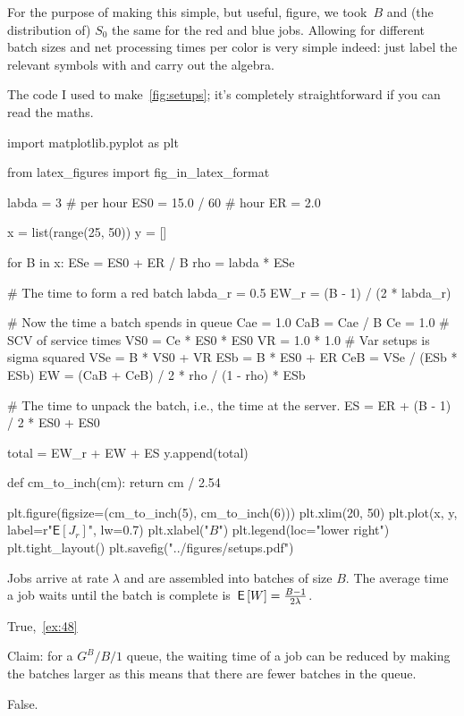 \documentclass[stochastic-or.tex]{subfiles}
\begin{document}
For the purpose of making this simple, but useful, figure, we took~$B$ and (the distribution of) $S_{0}$ the same for the red and blue jobs.
Allowing for different batch sizes and net processing times per color is very simple indeed: just label the relevant symbols with and carry out the algebra.

The code I used to make~\cref{fig:setups}; it's completely straightforward if you can read the maths.
\begin{python}
import matplotlib.pyplot as plt

from latex_figures import fig_in_latex_format


labda = 3  # per hour
ES0 = 15.0 / 60  # hour
ER = 2.0

x = list(range(25, 50))
y = []

for B in x:
    ESe = ES0 + ER / B
    rho = labda * ESe

    # The time to form a red batch
    labda_r = 0.5
    EW_r = (B - 1) / (2 * labda_r)

    # Now the time a batch spends in queue
    Cae = 1.0
    CaB = Cae / B
    Ce = 1.0  # SCV of service times
    VS0 = Ce * ES0 * ES0
    VR = 1.0 * 1.0  # Var setups is sigma squared
    VSe = B * VS0 + VR
    ESb = B * ES0 + ER
    CeB = VSe / (ESb * ESb)
    EW = (CaB + CeB) / 2 * rho / (1 - rho) * ESb

    # The time to unpack the batch, i.e., the time at the server.
    ES = ER + (B - 1) / 2 * ES0 + ES0

    total = EW_r + EW + ES
    y.append(total)


def cm_to_inch(cm):
    return cm / 2.54


plt.figure(figsize=(cm_to_inch(5), cm_to_inch(6)))
plt.xlim(20, 50)
plt.plot(x, y, label=r"$\mathsf{E}[J_r]$", lw=0.7)
plt.xlabel("$B$")
plt.legend(loc="lower right")
plt.tight_layout()
plt.savefig("../figures/setups.pdf")
\end{python}


\begin{truefalse}
 Jobs arrive at rate $\lambda$ and are assembled into batches of size $B$.
 The average time a job waits until the batch is complete is $\,\mathsf{E}\left[W\right] = \frac{B-1}{2\lambda}$.
\begin{solution}True,~\cref{ex:48}
\end{solution}
\end{truefalse}

\begin{truefalse}
    Claim: for a $G^{B}/B/1$ queue, the waiting time of a job can be reduced by making the batches larger as this means that there are fewer batches in the queue.
    \begin{solution}
        False.
    \end{solution}
\end{truefalse}
\end{document}
